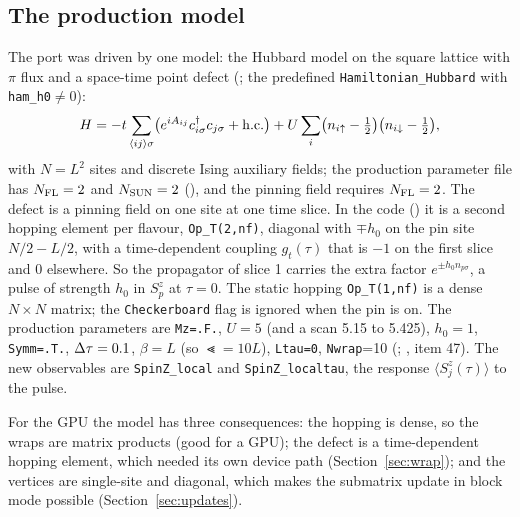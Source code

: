 \subsection{The production model}

The port was driven by one model: the Hubbard model on the square lattice with $\pi$ flux and a space-time point defect (; the predefined \texttt{Hamiltonian\_Hubbard} with \texttt{ham\_h0}$\ne0$):
\begin{equation}
H = -t\sum_{\langle ij\rangle\sigma}\bigl(e^{iA_{ij}}c^\dagger_{i\sigma}c_{j\sigma}+{\rm h.c.}\bigr) + U\sum_i\bigl(n_{i\uparrow}-\tfrac12\bigr)\bigl(n_{i\downarrow}-\tfrac12\bigr),
\end{equation}
with $N=L^2$ sites and discrete Ising auxiliary fields; the production parameter file has $N_{\rm FL}=2$ and $N_{\rm SUN}=2$ (), and the pinning field requires $N_{\rm FL}=2$. The defect is a pinning field on one site at one time slice. In the code () it is a second hopping element per flavour, \texttt{Op\_T(2,nf)}, diagonal with $\mp h_0$ on the pin site $N/2-L/2$, with a time-dependent coupling $g_t(\tau)$ that is $-1$ on the first slice and 0 elsewhere. So the propagator of slice 1 carries the extra factor $e^{\pm h_0 n_{p\sigma}}$, a pulse of strength $h_0$ in $S^z_p$ at $\tau=0$. The static hopping \texttt{Op\_T(1,nf)} is a dense $N\times N$ matrix; the \texttt{Checkerboard} flag is ignored when the pin is on. The production parameters are \texttt{Mz=.F.}, $U=5$ (and a scan 5.15 to 5.425), $h_0=1$, \texttt{Symm=.T.}, $\Delta\tau=0.1$, $\beta=L$ (so $\Lt=10L$), \texttt{Ltau=0}, \texttt{Nwrap}=10 (; , item 47). The new observables are \texttt{SpinZ\_local} and \texttt{SpinZ\_localtau}, the response $\langle S^z_j(\tau)\rangle$ to the pulse.

For the GPU the model has three consequences: the hopping is dense, so the wraps are matrix products (good for a GPU); the defect is a time-dependent hopping element, which needed its own device path (Section~\ref{sec:wrap}); and the vertices are single-site and diagonal, which makes the submatrix update in block mode possible (Section~\ref{sec:updates}).


